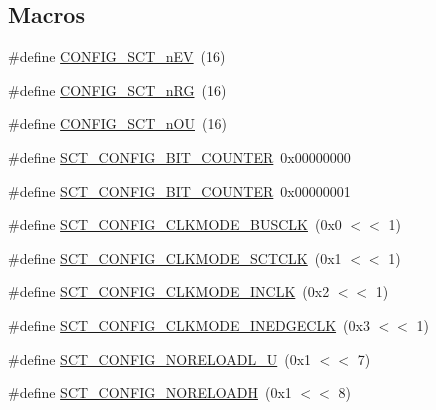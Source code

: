 \subsection*{Macros}
\begin{DoxyCompactItemize}
\item 
\#define \hyperlink{group___s_c_t__18_x_x__43_x_x_ga2672a9e7fb27a28b4f2dd7f4468f0010}{C\+O\+N\+F\+I\+G\+\_\+\+S\+C\+T\+\_\+n\+EV}~(16)
\item 
\#define \hyperlink{group___s_c_t__18_x_x__43_x_x_ga8d80e251208a01483a6b00c81ecb7493}{C\+O\+N\+F\+I\+G\+\_\+\+S\+C\+T\+\_\+n\+RG}~(16)
\item 
\#define \hyperlink{group___s_c_t__18_x_x__43_x_x_gab432d85ccb09a5c5d232916c8bb95089}{C\+O\+N\+F\+I\+G\+\_\+\+S\+C\+T\+\_\+n\+OU}~(16)
\item 
\#define \hyperlink{group___s_c_t__18_x_x__43_x_x_ga441708986d2cd57043b0603801c21450}{S\+C\+T\+\_\+\+C\+O\+N\+F\+I\+G\+\_\+B\+I\+T\+\_\+\+C\+O\+U\+N\+T\+ER}~0x00000000
\item 
\#define \hyperlink{group___s_c_t__18_x_x__43_x_x_ga579cb78a05f4c680e9ec5463dc5aeafd}{S\+C\+T\+\_\+\+C\+O\+N\+F\+I\+G\+\_\+B\+I\+T\+\_\+\+C\+O\+U\+N\+T\+ER}~0x00000001
\item 
\#define \hyperlink{group___s_c_t__18_x_x__43_x_x_ga54bd229bccde8e742610b8363d7f7a25}{S\+C\+T\+\_\+\+C\+O\+N\+F\+I\+G\+\_\+\+C\+L\+K\+M\+O\+D\+E\+\_\+\+B\+U\+S\+C\+LK}~(0x0 $<$$<$ 1)
\item 
\#define \hyperlink{group___s_c_t__18_x_x__43_x_x_ga2ef1357ae9969a9a1be753ab199e1aa1}{S\+C\+T\+\_\+\+C\+O\+N\+F\+I\+G\+\_\+\+C\+L\+K\+M\+O\+D\+E\+\_\+\+S\+C\+T\+C\+LK}~(0x1 $<$$<$ 1)
\item 
\#define \hyperlink{group___s_c_t__18_x_x__43_x_x_ga969d9166f635eeaab7fa6873fa2c6cc9}{S\+C\+T\+\_\+\+C\+O\+N\+F\+I\+G\+\_\+\+C\+L\+K\+M\+O\+D\+E\+\_\+\+I\+N\+C\+LK}~(0x2 $<$$<$ 1)
\item 
\#define \hyperlink{group___s_c_t__18_x_x__43_x_x_ga52bfacd5bd4daeda54ef29b9f11e400a}{S\+C\+T\+\_\+\+C\+O\+N\+F\+I\+G\+\_\+\+C\+L\+K\+M\+O\+D\+E\+\_\+\+I\+N\+E\+D\+G\+E\+C\+LK}~(0x3 $<$$<$ 1)
\item 
\#define \hyperlink{group___s_c_t__18_x_x__43_x_x_ga94c6dc388017b5e8038ad1dea8e32a3f}{S\+C\+T\+\_\+\+C\+O\+N\+F\+I\+G\+\_\+\+N\+O\+R\+E\+L\+O\+A\+D\+L\+\_\+U}~(0x1 $<$$<$ 7)
\item 
\#define \hyperlink{group___s_c_t__18_x_x__43_x_x_ga80da6c633fb897af2ee19bded9e43844}{S\+C\+T\+\_\+\+C\+O\+N\+F\+I\+G\+\_\+\+N\+O\+R\+E\+L\+O\+A\+DH}~(0x1 $<$$<$ 8)
\item 

\end{DoxyCompactItemize}
